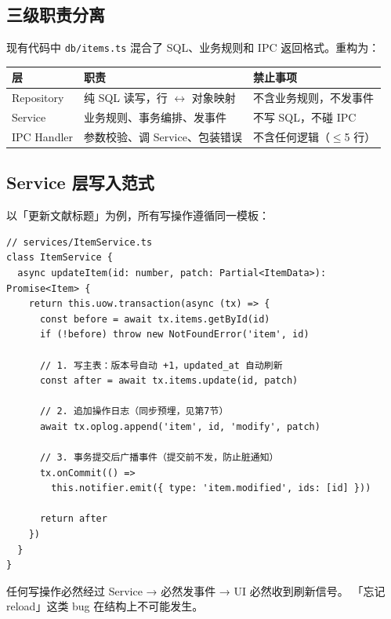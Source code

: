 \documentclass[12pt, a4paper]{article}
\begin{document}
\subsection{三级职责分离}

现有代码中 \texttt{db/items.ts} 混合了 SQL、业务规则和 IPC 返回格式。重构为：

\begin{center}
\begin{tabular}{p{3cm} p{4.6cm} p{4.8cm}}
  \toprule
  \textbf{层} & \textbf{职责} & \textbf{禁止事项} \\
  \midrule
  Repository & 纯 SQL 读写，行 $\leftrightarrow$ 对象映射 & 不含业务规则，不发事件 \\
  Service & 业务规则、事务编排、发事件 & 不写 SQL，不碰 IPC \\
  IPC Handler & 参数校验、调 Service、包装错误 & 不含任何逻辑（$\leq$5 行） \\
  \bottomrule
\end{tabular}
\end{center}

\subsection{Service 层写入范式}

以「更新文献标题」为例，所有写操作遵循同一模板：

\begin{lstlisting}[language={}]
// services/ItemService.ts
class ItemService {
  async updateItem(id: number, patch: Partial<ItemData>): Promise<Item> {
    return this.uow.transaction(async (tx) => {
      const before = await tx.items.getById(id)
      if (!before) throw new NotFoundError('item', id)

      // 1. 写主表：版本号自动 +1，updated_at 自动刷新
      const after = await tx.items.update(id, patch)

      // 2. 追加操作日志（同步预埋，见第7节）
      await tx.oplog.append('item', id, 'modify', patch)

      // 3. 事务提交后广播事件（提交前不发，防止脏通知）
      tx.onCommit(() =>
        this.notifier.emit({ type: 'item.modified', ids: [id] }))

      return after
    })
  }
}
\end{lstlisting}

\begin{tcolorbox}[fixbox, title={对策 \#1：解决「无变更通知」}]
  任何写操作必然经过 Service → 必然发事件 → UI 必然收到刷新信号。
  「忘记 reload」这类 bug 在结构上不可能发生。
\end{tcolorbox}
\end{document}
